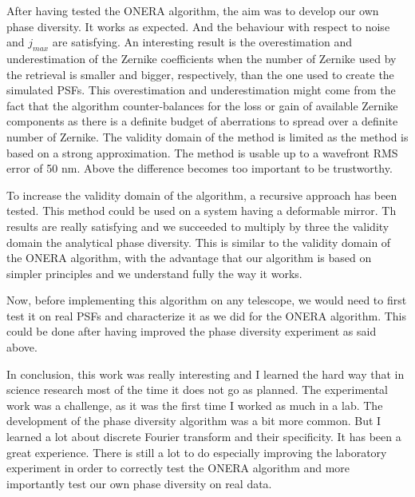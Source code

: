 \vspace{1cm}

After having tested the ONERA algorithm, the aim was to develop our own phase diversity. It works as expected. And the behaviour with respect to noise and $j_{max}$ are satisfying. An interesting result is the overestimation and underestimation of the Zernike coefficients when the number of Zernike used by the retrieval is smaller and bigger, respectively, than the one used to create the simulated PSFs. This overestimation and underestimation might come from the fact that the algorithm counter-balances for the loss or gain of available Zernike components as there is a definite budget of aberrations to spread over a definite number of Zernike. The validity domain of the method is limited as the method is based on a strong approximation. The method is usable up to a wavefront RMS error of 50 nm. Above the difference becomes too important to be trustworthy. 

To increase the validity domain of the algorithm, a recursive approach has been tested. This method could be used on a system having a deformable mirror. Th results are really satisfying and we succeeded to multiply by three the validity domain the analytical phase diversity. This is similar to the validity domain of the ONERA algorithm, with the advantage that our algorithm is based on simpler principles and we understand fully the way it works.

Now, before implementing this algorithm on any telescope, we would need to first test it on real PSFs and characterize it as we did for the ONERA algorithm. This could be done after having improved the phase diversity experiment as said above.

\vspace{1cm}

In conclusion, this work was really interesting and I learned the hard way that in science research most of the time it does not go as planned. The experimental work was a challenge, as it was the first time I worked as much in a lab. The development of the phase diversity algorithm was a bit more common. But I learned a lot about discrete Fourier transform and their specificity. It has been a great experience. There is still a lot to do especially improving the laboratory experiment in order to correctly test the ONERA algorithm and more importantly test our own phase diversity on real data. 